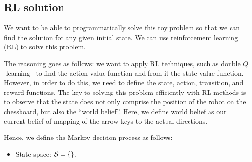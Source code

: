 \subsection{RL solution}
\label{ssec:rl_sol}
%
We want to be able to programmatically solve this toy problem so that we can 
find the solution for any given initial state. We can use reinforcement learning
(RL) to solve this problem. 

The reasoning goes as follows: we want to apply RL techniques, such as double
$Q$-learning~\cite{morales2020grokking} to find the action-value function and
from it the state-value function. However, in order to do this, we need to
define the state, action, transition, and reward functions. The key to solving 
this problem efficiently with RL methods is to observe that the state does not 
only comprise the position of the robot on the chessboard, but also the ``world 
belief''. Here, we define world belief as our current belief of mapping of the 
arrow keys to the actual directions.

Hence, we define the Markov decision process as follows:

\begin{itemize}
\item State space: $\mathcal{S} = \{\}$.
\end{itemize}